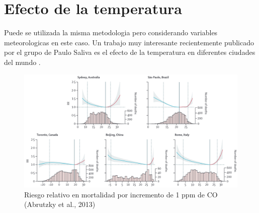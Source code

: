 \documentclass[]{book}
\begin{document}
\hypertarget{efecto-de-la-temperatura}{%
\section{Efecto de la temperatura}\label{efecto-de-la-temperatura}}

Puede se utilizada la misma metodologia pero considerando variables meteorologicas en este caso. Un trabajo muy interesante recientemente publicado por el grupo de Paulo Saliva es el efecto de la temperatura en diferentes ciudades del mundo \citep{GASPARRINI2015369}.

\begin{figure}
\includegraphics[width=18.97in,height=1.8\textheight]{figs/temp1} \caption{Riesgo relativo en mortalidad por incremento de 1 ppm de CO (Abrutzky et al., 2013)}\label{fig:unnamed-chunk-63}
\end{figure}


\end{document}
